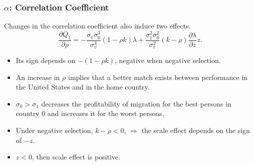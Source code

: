 \documentclass[10pt]{beamer}
\begin{document}
\begin{frame}[c]\frametitle{$\alpha$: Correlation Coefficient}

Changes in the correlation coefficient also induce two effects.
\begin{equation}
    \frac{\partial Q_{1}}{\partial \rho} = - \frac{\sigma_{1}\sigma_{0}^{3}}{\sigma_{v}^{3}}(1-\rho k) \lambda + \frac{\sigma_{1}^{2}\sigma_{0}^{2}}{\sigma_{v}^{2}}(k-\rho)\frac{\partial \lambda}{\partial z} z.
\end{equation}
\begin{itemize}
    \item Its sign depends on $-(1-\rho k)$, negative when negative selection.
    \item An increase in $\rho$ implies that a better match exists between performance in the United States and in the home country.
    \item $\sigma_{0} > \sigma_{1}$ decreases the  profitability  of migration for the best persons in country 0 and increases it for the worst persons.
    \item Under negative selection, $k-\rho <0$, $\Rightarrow$ the scale effect depends on the sign of $-z$.
    \item $z < 0$, then scale effect is positive.
\end{itemize}

\end{frame}
\end{document}
